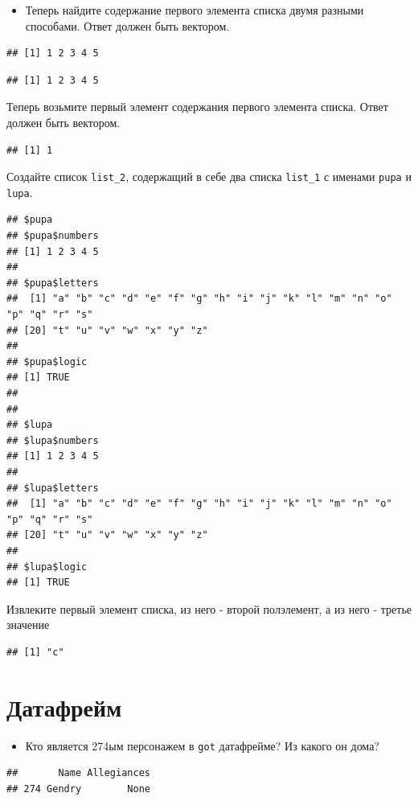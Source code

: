 \documentclass[]{book}
\providecommand{\tightlist}{%
  \setlength{\itemsep}{0pt}\setlength{\parskip}{0pt}}
\begin{document}
\begin{itemize}
\tightlist
\item
  Теперь найдите содержание первого элемента списка двумя разными
  способами. Ответ должен быть вектором.
\end{itemize}

\begin{verbatim}
## [1] 1 2 3 4 5
\end{verbatim}

\begin{verbatim}
## [1] 1 2 3 4 5
\end{verbatim}

Теперь возьмите первый элемент содержания первого элемента списка. Ответ
должен быть вектором.

\begin{verbatim}
## [1] 1
\end{verbatim}

Создайте список \texttt{list\_2}, содержащий в себе два списка
\texttt{list\_1} с именами \texttt{pupa} и \texttt{lupa}.

\begin{verbatim}
## $pupa
## $pupa$numbers
## [1] 1 2 3 4 5
## 
## $pupa$letters
##  [1] "a" "b" "c" "d" "e" "f" "g" "h" "i" "j" "k" "l" "m" "n" "o" "p" "q" "r" "s"
## [20] "t" "u" "v" "w" "x" "y" "z"
## 
## $pupa$logic
## [1] TRUE
## 
## 
## $lupa
## $lupa$numbers
## [1] 1 2 3 4 5
## 
## $lupa$letters
##  [1] "a" "b" "c" "d" "e" "f" "g" "h" "i" "j" "k" "l" "m" "n" "o" "p" "q" "r" "s"
## [20] "t" "u" "v" "w" "x" "y" "z"
## 
## $lupa$logic
## [1] TRUE
\end{verbatim}

Извлеките первый элемент списка, из него - второй полэлемент, а из него
- третье значение

\begin{verbatim}
## [1] "c"
\end{verbatim}

\section{Датафрейм}\label{df_task}

\begin{itemize}
\tightlist
\item
  Кто является 274ым персонажем в \texttt{got} датафрейме? Из какого он
  дома?
\end{itemize}

\begin{verbatim}
##       Name Allegiances
## 274 Gendry        None
\end{verbatim}
\end{document}
